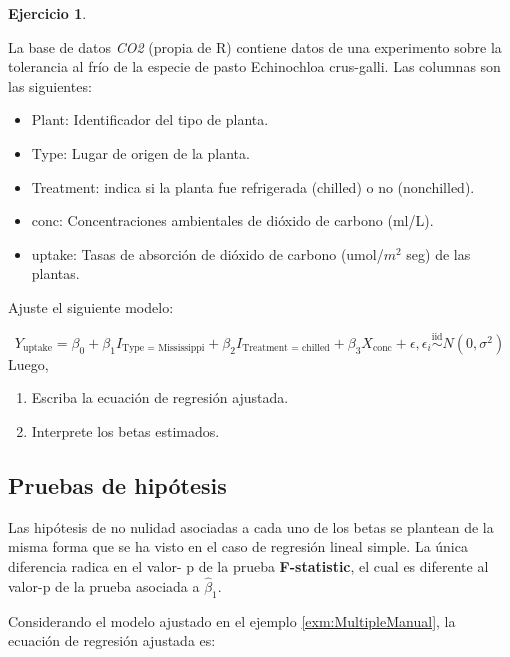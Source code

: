 \documentclass[
  11pt,
]{book}
\providecommand{\tightlist}{%
  \setlength{\itemsep}{0pt}\setlength{\parskip}{0pt}}
\theoremstyle{definition}
\theoremstyle{definition}
\theoremstyle{definition}
\newtheorem{exercise}{Ejercicio}[chapter]
\theoremstyle{definition}
\theoremstyle{remark}
\begin{document}
\begin{exercise}
\protect\hypertarget{exr:co2}{}\label{exr:co2}

La base de datos \emph{CO2} (propia de R) contiene datos de una experimento sobre la tolerancia al frío de la especie de pasto Echinochloa crus-galli. Las columnas son las siguientes:

\begin{itemize}
\tightlist
\item
  Plant: Identificador del tipo de planta.
\item
  Type: Lugar de origen de la planta.
\item
  Treatment: indica si la planta fue refrigerada (chilled) o no (nonchilled).
\item
  conc: Concentraciones ambientales de dióxido de carbono (ml/L).
\item
  uptake: Tasas de absorción de dióxido de carbono (umol/\(m^2\) seg) de las plantas.
\end{itemize}

Ajuste el siguiente modelo:

\[
Y_{\text{uptake}} = \beta_0 + \beta_1I_{\text{Type = Mississippi}} + \beta_2I_{\text{Treatment = chilled}} +  \beta_3X_{\text{conc}} + \epsilon, \epsilon_i \overset{\text{iid}}{\sim} N(0,\sigma^2)
\]
Luego,

\begin{enumerate}
\def\labelenumi{\arabic{enumi}.}
\tightlist
\item
  Escriba la ecuación de regresión ajustada.
\item
  Interprete los betas estimados.
\end{enumerate}

\end{exercise}

\subsection{Pruebas de hipótesis}\label{pruebas-de-hipuxf3tesis}

Las hipótesis de no nulidad asociadas a cada uno de los betas se plantean de la misma forma que se ha visto en el caso de regresión lineal simple. La única diferencia radica en el valor- p de la prueba \textbf{F-statistic}, el cual es diferente al valor-p de la prueba asociada a \(\widehat{\beta}_1\).

Considerando el modelo ajustado en el ejemplo \ref{exm:MultipleManual}, la ecuación de regresión ajustada es:
\end{document}
